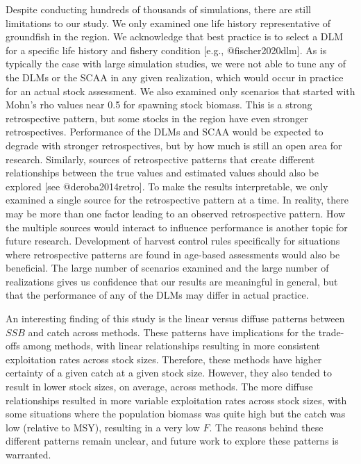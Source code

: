 \documentclass[
]{article}
\begin{document}
Despite conducting hundreds of thousands of simulations, there are still limitations to our study. We only examined one life history representative of groundfish in the region. We acknowledge that best practice is to select a DLM for a specific life history and fishery condition {[}e.g., @fischer2020dlm{]}. As is typically the case with large simulation studies, we were not able to tune any of the DLMs or the SCAA in any given realization, which would occur in practice for an actual stock assessment. We also examined only scenarios that started with Mohn's rho values near 0.5 for spawning stock biomass. This is a strong retrospective pattern, but some stocks in the region have even stronger retrospectives. Performance of the DLMs and SCAA would be expected to degrade with stronger retrospectives, but by how much is still an open area for research. Similarly, sources of retrospective patterns that create different relationships between the true values and estimated values should also be explored {[}see @deroba2014retro{]}. To make the results interpretable, we only examined a single source for the retrospective pattern at a time. In reality, there may be more than one factor leading to an observed retrospective pattern. How the multiple sources would interact to influence performance is another topic for future research. Development of harvest control rules specifically for situations where retrospective patterns are found in age-based assessments would also be beneficial. The large number of scenarios examined and the large number of realizations gives us confidence that our results are meaningful in general, but that the performance of any of the DLMs may differ in actual practice.

An interesting finding of this study is the linear versus diffuse patterns between \(SSB\) and catch across methods. These patterns have implications for the trade-offs among methods, with linear relationships resulting in more consistent exploitation rates across stock sizes. Therefore, these methods have higher certainty of a given catch at a given stock size. However, they also tended to result in lower stock sizes, on average, across methods. The more diffuse relationships resulted in more variable exploitation rates across stock sizes, with some situations where the population biomass was quite high but the catch was low (relative to MSY), resulting in a very low \(F\). The reasons behind these different patterns remain unclear, and future work to explore these patterns is warranted.
\end{document}
